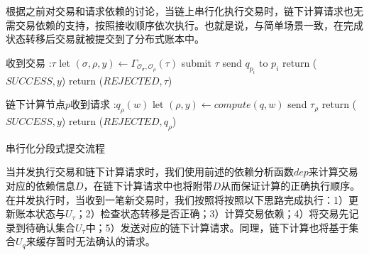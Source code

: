 根据之前对交易和请求依赖的讨论，当链上串行化执行交易时，链下计算请求也无需交易依赖的支持，按照接收顺序依次执行。也就是说，与简单场景一致，在完成状态转移后交易就被提交到了分布式账本中。
\begin{algorithm}[H]
    \begin{algorithmic} 
        \item[收到交易]:$\tau$
        \STATE let $(\sigma, \rho, y) \leftarrow \Gamma_{\mathcal{O}_\sigma, \mathcal{O}_\rho}(\tau)$
        \IF {$\sigma \neq \perp \wedge \rho \neq \perp$}
        \STATE submit $\tau$
        \STATE send $q_{p_i}$ to $p_i$
        \ENDFOR
        \STATE return ($SUCCESS, y$)
        \ENDIF
        \STATE return ($REJECTED, \tau$)
        \item[链下计算节点$p$收到请求]:$q_\rho(w)$
        \STATE let $(\rho, y) \leftarrow compute(q, w)$
        \IF {$\rho \neq \perp$}
        \STATE send $\tau_\rho$
        \STATE return ($SUCCESS, y$)
        \ENDIF
        \STATE return ($REJECTED, q_\rho$)
    \end{algorithmic}
    \caption{\label{alg:ch3-6}串行化分段式提交流程}
\end{algorithm}

当并发执行交易和链下计算请求时，我们使用前述的依赖分析函数$dep$来计算交易对应的依赖信息$D$，在链下计算请求中也将附带$D$从而保证计算的正确执行顺序。在并发执行时，当收到一笔新交易时，我们按照将按照以下思路完成执行：1）更新账本状态与$U_\tau$；2）检查状态转移是否正确；3）计算交易依赖；4）将交易先记录到待确认集合$U_\tau$中；5）发送对应的链下计算请求。同理，链下计算也将基于集合$U_q$来缓存暂时无法确认的请求。

